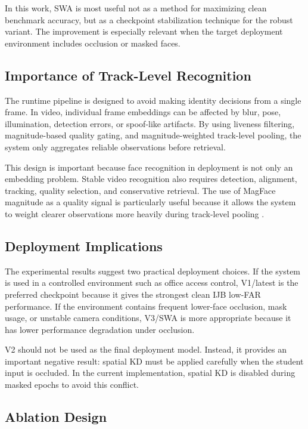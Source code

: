 In this work, SWA is most useful not as a method for maximizing clean benchmark accuracy, but as a checkpoint stabilization technique for the robust variant. The improvement is especially relevant when the target deployment environment includes occlusion or masked faces.

\subsection{Importance of Track-Level Recognition}

The runtime pipeline is designed to avoid making identity decisions from a single frame. In video, individual frame embeddings can be affected by blur, pose, illumination, detection errors, or spoof-like artifacts. By using liveness filtering, magnitude-based quality gating, and magnitude-weighted track-level pooling, the system only aggregates reliable observations before retrieval.

This design is important because face recognition in deployment is not only an embedding problem. Stable video recognition also requires detection, alignment, tracking, quality selection, and conservative retrieval. The use of MagFace magnitude as a quality signal is particularly useful because it allows the system to weight clearer observations more heavily during track-level pooling \cite{magface}.

\subsection{Deployment Implications}

The experimental results suggest two practical deployment choices. If the system is used in a controlled environment such as office access control, V1/latest is the preferred checkpoint because it gives the strongest clean IJB low-FAR performance. If the environment contains frequent lower-face occlusion, mask usage, or unstable camera conditions, V3/SWA is more appropriate because it has lower performance degradation under occlusion.

V2 should not be used as the final deployment model. Instead, it provides an important negative result: spatial KD must be applied carefully when the student input is occluded. In the current implementation, spatial KD is disabled during masked epochs to avoid this conflict.

\subsection{Ablation Design}

